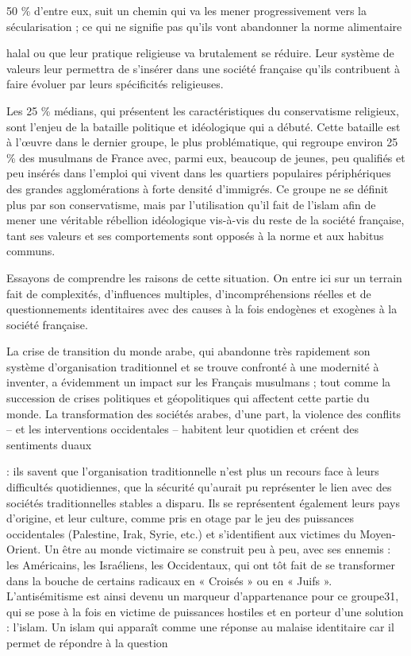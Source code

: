 50 \% d'entre eux, suit un chemin qui va les mener progressivement vers
la sécularisation ; ce qui ne signifie pas qu'ils vont abandonner la
norme alimentaire



halal ou que leur pratique religieuse va brutalement se réduire. Leur
système de valeurs leur permettra de s'insérer dans une société
française qu'ils contribuent à faire évoluer par leurs spécificités
religieuses.

Les 25 \% médians, qui présentent les caractéristiques du conservatisme
religieux, sont l'enjeu de la bataille politique et idéologique qui a
débuté. Cette bataille est à l'œuvre dans le dernier groupe, le plus
problématique, qui regroupe environ 25 \% des musulmans de France avec,
parmi eux, beaucoup de jeunes, peu qualifiés et peu insérés dans
l'emploi qui vivent dans les quartiers populaires périphériques des
grandes agglomérations à forte densité d'immigrés. Ce groupe ne se
définit plus par son conservatisme, mais par l'utilisation qu'il fait de
l'islam afin de mener une véritable rébellion idéologique vis-à-vis du
reste de la société française, tant ses valeurs et ses comportements
sont opposés à la norme et aux habitus communs.

Essayons de comprendre les raisons de cette situation. On entre ici sur
un terrain fait de complexités, d'influences multiples,
d'incompréhensions réelles et de questionnements identitaires avec des
causes à la fois endogènes et exogènes à la société française.

La crise de transition du monde arabe, qui abandonne très rapidement son
système d'organisation traditionnel et se trouve confronté à une
modernité à inventer, a évidemment un impact sur les Français musulmans
; tout comme la succession de crises politiques et géopolitiques qui
affectent cette partie du monde. La transformation des sociétés arabes,
d'une part, la violence des conflits -- et les interventions
occidentales -- habitent leur quotidien et créent des sentiments duaux

: ils savent que l'organisation traditionnelle n'est plus un recours
face à leurs difficultés quotidiennes, que la sécurité qu'aurait pu
représenter le lien avec des sociétés traditionnelles stables a disparu.
Ils se représentent également leurs pays d'origine, et leur culture,
comme pris en otage par le jeu des puissances occidentales (Palestine,
Irak, Syrie, etc.) et s'identifient aux victimes du Moyen-Orient. Un
être au monde victimaire se construit peu à peu, avec ses ennemis : les
Américains, les Israéliens, les Occidentaux, qui ont tôt fait de se
transformer dans la bouche de certains radicaux en « Croisés » ou en «
Juifs ». L'antisémitisme est ainsi devenu un marqueur d'appartenance
pour ce groupe31, qui se pose à la fois en victime de puissances
hostiles et en porteur d'une solution : l'islam. Un islam qui apparaît
comme une réponse au malaise identitaire car il permet de répondre à la
question

